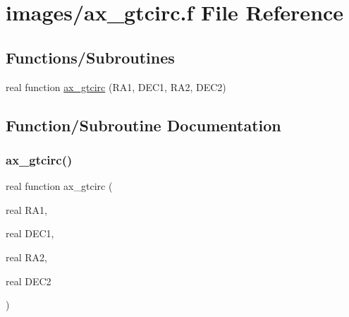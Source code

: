 \hypertarget{ax__gtcirc_8f}{}\section{images/ax\+\_\+gtcirc.f File Reference}
\label{ax__gtcirc_8f}
\subsection*{Functions/\+Subroutines}
\begin{DoxyCompactItemize}
\item 
real function \hyperlink{ax__gtcirc_8f_ac17aa66e53b17012d879d4fe3e09d53f}{ax\+\_\+gtcirc} (R\+A1, D\+E\+C1, R\+A2, D\+E\+C2)
\end{DoxyCompactItemize}


\subsection{Function/\+Subroutine Documentation}
\mbox{\label{ax__gtcirc_8f_ac17aa66e53b17012d879d4fe3e09d53f}} 
\subsubsection{\texorpdfstring{ax\+\_\+gtcirc()}{ax\_gtcirc()}}
{\footnotesize\ttfamily real function ax\+\_\+gtcirc (\begin{DoxyParamCaption}\item[{real}]{R\+A1,  }\item[{real}]{D\+E\+C1,  }\item[{real}]{R\+A2,  }\item[{real}]{D\+E\+C2 }\end{DoxyParamCaption})}

